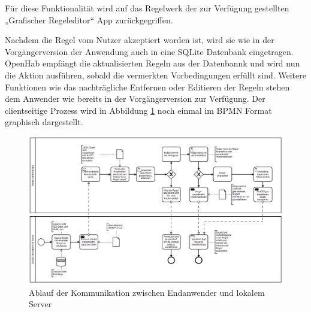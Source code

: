 Für diese Funktionalität wird auf das Regelwerk der zur Verfügung gestellten „Grafischer Regeleditor“ App zurückgegriffen. 

Nachdem die Regel vom Nutzer akzeptiert worden ist, wird sie wie in der Vorgängerversion der Anwendung auch in eine SQLite Datenbank eingetragen. OpenHab empfängt die aktualisierten Regeln aus der Datenbannk und wird nun die Aktion ausführen, sobald die vermerkten Vorbedingungen erfüllt sind.
Weitere Funktionen wie das nachträgliche Entfernen oder Editieren der Regeln stehen dem Anwender wie bereits in der Vorgängerversion zur Verfügung.
Der clientseitige Prozess wird in Abbildung \ref{fig:Kommunikationsablauf} noch einmal im BPMN Format graphisch dargestellt.
\newpage
\begin{figure}[!ht]
    \centering
    \includegraphics[width= 1.47\textwidth, angle=90,origin=c]{figures/Appbildungen/diagramm_app.PNG}
    \caption{Ablauf der Kommunikation zwischen Endanwender und lokalem Server}
    \label{fig:Kommunikationsablauf}
\end{figure}